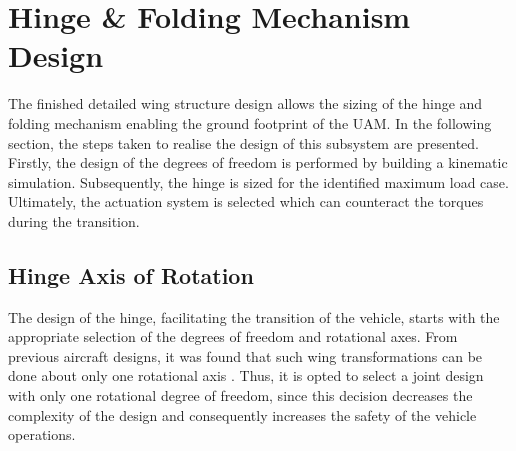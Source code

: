 \section{Hinge \& Folding Mechanism Design}
\label{sec:hingedesign}
The finished detailed wing structure design allows the sizing of the hinge and folding mechanism enabling the ground footprint of the UAM. In the following section, the steps taken to realise the design of this subsystem are presented.
Firstly, the design of the degrees of freedom is performed by building a kinematic simulation.
Subsequently, the hinge is sized for the identified maximum load case.
Ultimately, the actuation system is selected which can counteract the torques during the transition.

\subsection{Hinge Axis of Rotation}
\label{subsec:axis}
\label{sec:hinge_axis_of_rotation}
The design of the hinge, facilitating the transition of the vehicle, starts with the appropriate selection of the degrees of freedom and rotational axes.
From previous aircraft designs, it was found that such wing transformations can be done about only one rotational axis \cite{pterodynamics_site}.
Thus, it is opted to select a joint design with only one rotational degree of freedom, since this decision decreases the complexity of the design and consequently increases the safety of the vehicle operations.


